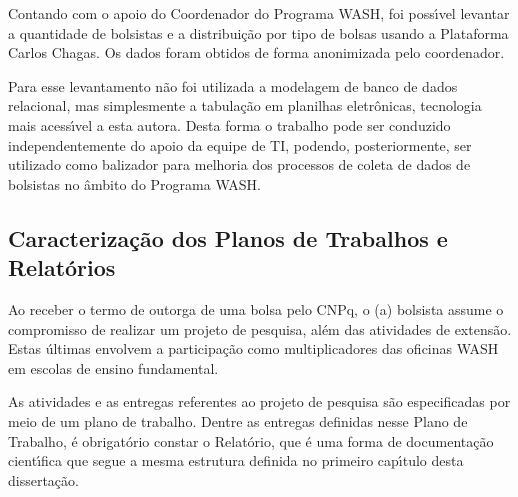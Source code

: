 \documentclass[
12pt,		%
openright,	%
twoside,  %
a4paper,			%
chapter=TITLE,		%
english,			%
french,				%
spanish,			%
brazil				%
]{USPSC-classe/USPSC}
\begin{document}
Contando com o apoio do Coordenador do Programa WASH, foi poss\'{\i}vel levantar a quantidade de bolsistas e a distribui\c{c}\~ao por tipo de bolsas usando a Plataforma Carlos Chagas. Os dados foram obtidos de forma anonimizada pelo coordenador.

















Para esse levantamento n\~ao foi utilizada a modelagem de banco de dados relacional, mas simplesmente a tabula\c{c}\~ao em planilhas eletr\^onicas, tecnologia mais acess\'{\i}vel a esta autora. Desta forma o trabalho pode ser conduzido independentemente do apoio da equipe de TI, podendo, posteriormente, ser utilizado como balizador para melhoria dos processos de coleta de dados de bolsistas no \^ambito do Programa WASH.

















\subsection[Caracteriza\c{c}\~ao dos Planos de Trabalhos e Relat\'orios]{Caracteriza\c{c}\~ao dos Planos de Trabalhos e Relat\'orios}\label{Caracteriza\c{c}\~ao dos Planos de Trabalhos e Relat\'orios}
Ao receber o termo de outorga de uma bolsa pelo CNPq, o (a) bolsista assume o compromisso de realizar um projeto de pesquisa, al\'em das atividades de extens\~ao. Estas \'ultimas envolvem a participa\c{c}\~ao como multiplicadores das oficinas WASH em escolas de ensino fundamental.

















As atividades e as entregas referentes ao projeto de pesquisa s\~ao especificadas por meio de um plano de trabalho. Dentre as entregas definidas nesse Plano de Trabalho, \'e obrigat\'orio constar o Relat\'orio, que \'e uma forma de documenta\c{c}\~ao cient\'{\i}fica que segue a mesma estrutura definida no primeiro cap\'{\i}tulo desta disserta\c{c}\~ao.
\end{document}
